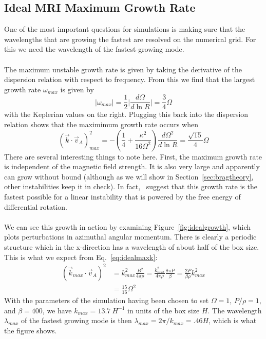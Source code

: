 \subsection{Ideal MRI Maximum Growth Rate}
One of the most important questions for simulations is making sure that the wavelengths that are growing the fastest are resolved on the numerical grid. For this we need the wavelength of the fastest-growing mode. \\
\\
The maximum unstable growth rate is given by taking the derivative of the dispersion relation with respect to frequency. From this we find that the largest growth rate $\omega_{max}$ is given by
\begin{equation}
  |\omega_{max}|=\frac12\big|\frac{d\Omega}{d\ln R}\big|=\frac34\Omega
\end{equation}
with the Keplerian values on the right. Plugging this back into the dispersion relation shows that the maximimum growth rate occurs when
\begin{equation}
  (\vec k\cdot\vec v_A)^2_{max}=-\left(\frac14+\frac{\kappa^2}{16\Omega^2}\right)\frac{d\Omega^2}{d\ln R}=\frac{\sqrt{15}}{4}\Omega \label{eq:idealmaxk}
\end{equation}
There are several interesting things to note here. First, the maximum growth rate is independent of the magnetic field strength. It is also very large and apparently can grow without bound (although as we will show in Section~\ref{sec:bragtheory}, other instabilities keep it in check). In fact,~\citet{BH1992a} suggest that this growth rate is the fastest possible for a linear instability that is powered by the free energy of differential rotation. \\
\\
We can see this growth in action by examining Figure~\ref{fig:idealgrowth}, which plots perturbations in azimuthal angular momentum. There is clearly a periodic structure which in the x-direction has a wavelength of about half of the box size. This is what we expect from Eq.~\ref{eq:idealmaxk}:
\begin{align*}
  (\vec k_{max}\cdot \vec v_A)^2&=k_{max}^2\frac{B^2}{4\pi\rho}=\frac{k_{max}^2}{4\pi\rho}\frac{8\pi P}{\beta}=\frac{2P}{\beta\rho}k_{max}^2\\
  &=\frac{15}{16}\Omega^2
\end{align*}
With the parameters of the simulation having been chosen to set $\Omega=1$, $P/\rho=1$, and $\beta=400$, we have $k_{max}=13.7~H^{-1}$ in units of the box size $H$. The wavelength $\lambda_{max}$ of the fastest growing mode is then $\lambda_{max}=2\pi/k_{max}=.46H$, which is what the figure shows. \\
